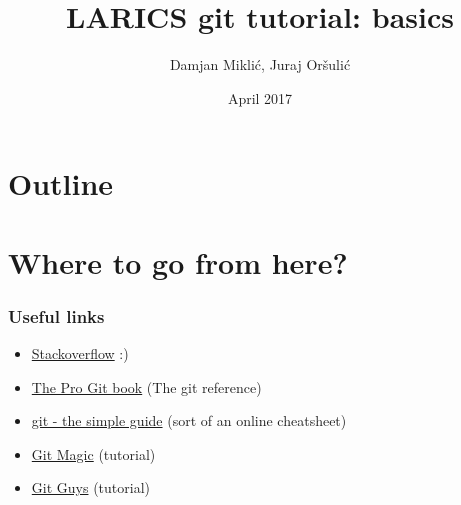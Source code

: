 \documentclass{beamer}%
\title[git basics]
{LARICS git tutorial: basics}
\author[Mikli\'{c}, Or\v{s}uli\'{c}]{Damjan Mikli\'{c}, Juraj Or\v{s}uli\'{c}}
\institute[LARICS]{LARICS Lab\\FER, University of Zagreb}
\date[]{April 2017}
\begin{document}

\begin{frame}
	\titlepage
\end{frame}


\section*{Outline}
\begin {frame}
	\tableofcontents
\end{frame}












\section{Where to go from here?}

\begin{frame}
	\frametitle{Useful links}
	
	\begin{itemize}
		\item \href{http://stackoverflow.com/questions/tagged/git}{Stackoverflow} :)
		\item \href{https://git-scm.com/book/en/v2}{The Pro Git book} (The git reference)
		\item \href{http://rogerdudler.github.io/git-guide/}{git - the simple guide} (sort of an online cheatsheet)
		\item \href{http://www-cs-students.stanford.edu/~blynn/gitmagic/}{Git Magic} (tutorial) 
		\item \href{http://www.gitguys.com/}{Git Guys} (tutorial)
	\end{itemize}
	
\end{frame}
\end{document}
